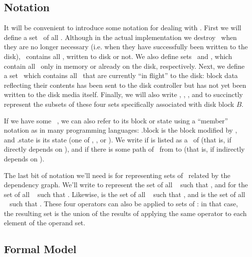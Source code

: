 \subsection{Notation}
\label{sec:chdescs:notation}

It will be convenient to introduce some notation for dealing with \chdescs.
First we will define a set \ChAll\ of all \chdescs. Although in the actual
implementation we destroy \chdescs\ when they are no longer necessary (i.e. when
they have successfully been written to the disk), \ChAll\ contains all \chdescs,
written to disk or not. We also define sets \ChMem\ and \ChDisk, which contain
all \chdescs\ only in memory or already on the disk, respectively. Next, we
define a set \ChInf\ which contains all \chdescs\ that are currently ``in
flight'' to the disk: block data reflecting their contents has been sent to the
disk controller but has not yet been written to the disk media itself. Finally,
we will also write , , , and  to
succinctly represent the subsets of these four sets specifically associated with
disk block $B$.

If we have some \chdesc\ , we can also refer to its block or state using a
``member'' notation as in many programming languages: .block is the block
modified by , and .state is its state (one of \statenone, \stateinf,
or \statedisk). We write  if  is listed as a \before\
of  (that is, if  directly depends on ), and
 if there is some path of \befores\ from  to
\p{q} (that is, if \p{p} indirectly depends on ).

The last bit of notation we'll need is for representing sets of \chdescs\
related by the dependency graph. We'll write  to represent the set of
all \chdescs\  such that \depends{p}{q}, and \BeforeS{p} for the set of all
\chdescs\  such that \indirdepends{p}{q}. Likewise, \After{p} is the set of
all \chdescs\ \p{q} such that \depends{q}{p}, and \AfterS{p} is the set of all
\chdescs\ \p{q} such that \indirdepends{q}{p}. These four operators can also be
applied to sets of \chdescs: in that case, the resulting set is the union of the
results of applying the same operator to each element of the operand set.

\subsection{Formal Model}
\label{sec:chdescs:model}

